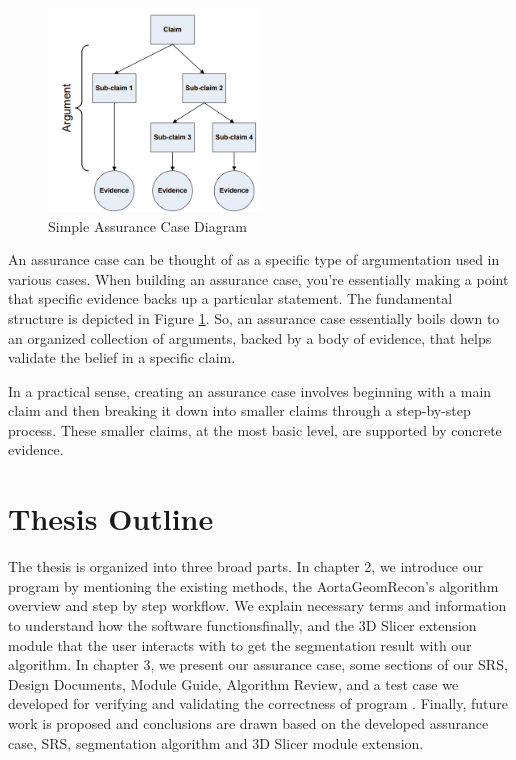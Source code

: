\begin{figure}[ht]
    \centering
    \includegraphics[width=0.5\textwidth]{figures/Intro/ac_diagram.png}
    \caption[Simple Assurance Case Diagram]{Simple Assurance Case Diagram}
    \label{fig_ac_diagram}
\end{figure}


An assurance case can be thought of as a specific type of argumentation used in various cases. When building an assurance case, you're essentially making a point that specific evidence backs up a particular statement. The fundamental structure is depicted in Figure \ref{fig_ac_diagram}. So, an assurance case essentially boils down to an organized collection of arguments, backed by a body of evidence, that helps validate the belief in a specific claim.

In a practical sense, creating an assurance case involves beginning with a main claim and then breaking it down into smaller claims through a step-by-step process. These smaller claims, at the most basic level, are supported by concrete evidence.


\section{Thesis Outline} \label{TO}

The thesis is organized into three broad parts. In chapter 2, we introduce our program \progname{} by mentioning the existing methods, the AortaGeomRecon's algorithm overview and step by step  workflow. We explain necessary terms and information to understand how the software functionsfinally, and the 3D Slicer extension module that the user interacts with to get the segmentation result with our algorithm. In chapter 3, we present our assurance case, some sections of our SRS, Design Documents, Module Guide, Algorithm Review, and a test case we developed for verifying and validating the correctness of program \progname{}. Finally, future work is proposed and conclusions are drawn based on the developed assurance case, SRS, segmentation algorithm and 3D Slicer module extension.